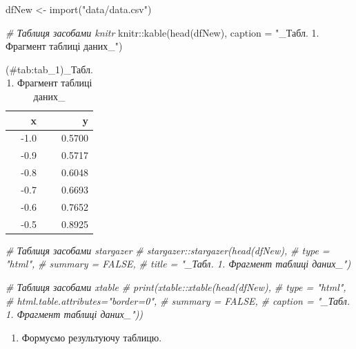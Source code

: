 \documentclass[
]{book}
\newenvironment{Shaded}{\begin{snugshade}}{\end{snugshade}}
\newcommand{\AttributeTok}[1]{\textcolor[rgb]{0.77,0.63,0.00}{#1}}
\newcommand{\CommentTok}[1]{\textcolor[rgb]{0.56,0.35,0.01}{\textit{#1}}}
\newcommand{\FunctionTok}[1]{\textcolor[rgb]{0.00,0.00,0.00}{#1}}
\newcommand{\NormalTok}[1]{#1}
\newcommand{\OtherTok}[1]{\textcolor[rgb]{0.56,0.35,0.01}{#1}}
\newcommand{\SpecialCharTok}[1]{\textcolor[rgb]{0.00,0.00,0.00}{#1}}
\newcommand{\StringTok}[1]{\textcolor[rgb]{0.31,0.60,0.02}{#1}}
\providecommand{\tightlist}{%
  \setlength{\itemsep}{0pt}\setlength{\parskip}{0pt}}
\begin{document}
\begin{Shaded}
\begin{Highlighting}[]
\NormalTok{dfNew }\OtherTok{\textless{}{-}}  \FunctionTok{import}\NormalTok{(}\StringTok{"data/data.csv"}\NormalTok{)}

\CommentTok{\# Таблиця засобами knitr}
\NormalTok{knitr}\SpecialCharTok{::}\FunctionTok{kable}\NormalTok{(}\FunctionTok{head}\NormalTok{(dfNew),}
             \AttributeTok{caption =} \StringTok{"\_Табл. 1. Фрагмент таблиці даних\_"}\NormalTok{)}
\end{Highlighting}
\end{Shaded}

\begin{table}

\caption{(\#tab:tab_1)_Табл. 1. Фрагмент таблиці даних_}
\centering
\begin{tabular}[t]{r|r}
\hline
x & y\\
\hline
-1.0 & 0.5700\\
\hline
-0.9 & 0.5717\\
\hline
-0.8 & 0.6048\\
\hline
-0.7 & 0.6693\\
\hline
-0.6 & 0.7652\\
\hline
-0.5 & 0.8925\\
\hline
\end{tabular}
\end{table}

\begin{Shaded}
\begin{Highlighting}[]
\CommentTok{\# Таблиця засобами stargazer}
\CommentTok{\# stargazer::stargazer(head(dfNew),}
\CommentTok{\#                      type = "html",}
\CommentTok{\#                      summary = FALSE,}
\CommentTok{\#              title = "\_Табл. 1. Фрагмент таблиці даних\_")}


\CommentTok{\# Таблиця засобами xtable}
\CommentTok{\# print(xtable::xtable(head(dfNew),}
\CommentTok{\#                      type = "html",}
\CommentTok{\#                      html.table.attributes="border=0",}
\CommentTok{\#                      summary = FALSE,}
\CommentTok{\#              caption = "\_Табл. 1. Фрагмент таблиці даних\_"))}
\end{Highlighting}
\end{Shaded}

\begin{enumerate}
\def\labelenumi{\arabic{enumi}.}
\setcounter{enumi}{5}
\tightlist
\item
  Формуємо результуючу таблицю.
\end{enumerate}
\end{document}
